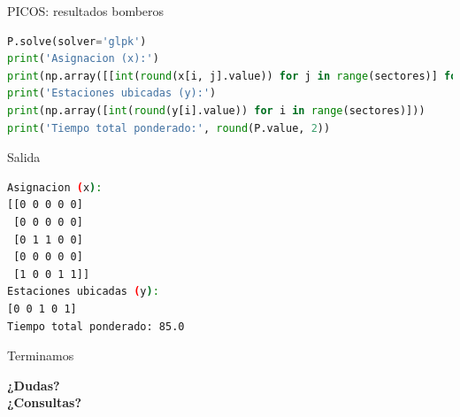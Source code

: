\documentclass{beamer}
\begin{document}
\begin{frame}[fragile]{PICOS: resultados bomberos}
    \begin{lstlisting}[language=Python]
P.solve(solver='glpk')
print('Asignacion (x):')
print(np.array([[int(round(x[i, j].value)) for j in range(sectores)] for i in range(sectores)]))
print('Estaciones ubicadas (y):')
print(np.array([int(round(y[i].value)) for i in range(sectores)]))
print('Tiempo total ponderado:', round(P.value, 2))
    \end{lstlisting}
\end{frame}

\begin{frame}[fragile]{Salida}
    \begin{lstlisting}[language=bash,backgroundcolor=\color{black},basicstyle=\color{white}\ttfamily,numbers=none]
Asignacion (x):
[[0 0 0 0 0]
 [0 0 0 0 0]
 [0 1 1 0 0]
 [0 0 0 0 0]
 [1 0 0 1 1]]
Estaciones ubicadas (y):
[0 0 1 0 1]
Tiempo total ponderado: 85.0
    \end{lstlisting}
\end{frame}

\begin{frame}{Terminamos}
    \begin{center}
        \Large{\textbf{¿Dudas?\\¿Consultas?}}
    \end{center}
\end{frame}
\end{document}

